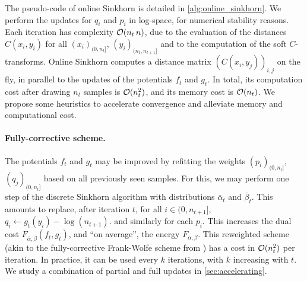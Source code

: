 The pseudo-code of online Sinkhorn is detailed in \autoref{alg:online_sinkhorn}.
We perform the updates for $q_i$ and $p_i$ in log-space, for numerical stability reasons.
Each iteration has complexity $\mathcal{O}(n_t\,n)$, due to the evaluation of the
distances $C(x_i, y_i)$ for all $(x_i)_{(0, n_t]}$, $(y_i)_{(n_t, n_{t+1}]}$
and to the computation of the
soft $C$-transforms. Online Sinkhorn computes a distance matrix
$(C(x_i,y_j))_{i,j}$ on the fly, in parallel to the updates of the potentials
$f_t$ and $g_t$. In total, its computation cost after drawing $n_t$ samples is
$\mathcal{O}(n_t^2)$, and its memory cost is $\mathcal{O}(n_t)$.
%
We propose some heuristics to accelerate convergence and alleviate memory and computational cost.


\paragraph{Fully-corrective scheme.} 

The potentials $f_t$ and $g_t$ may be improved by refitting the weights
$(p_i)_{(0, n_t]}$, $(q_j)_{(0, n_t]}$ based on all previously seen samples.  For this, we 
may perform one step of the discrete Sinkhorn algorithm with
distributions $\bar \alpha_t$ and $\bar \beta_t$.
This amounts to replace, after iteration $t$, for all $i \in (0, n_{t+1}]$,
$q_i \gets g_t(y_i) - \log(n_{t+1})$. and similarly for each $p_i$. This increases the dual cost
$F_{ \bar \alpha, \bar \beta}(f_t, g_t)$, and ``on average'', the energy
$F_{\alpha, \beta}$. This reweighted scheme (akin to the fully-corrective
Frank-Wolfe scheme from \cite{lacoste2015global}) has a cost in $\mathcal{O}(n_t^2)$
per iteration. In practice, it can be used every $k$ iterations, with $k$
increasing with $t$. We study a combination of partial and full updates in
\autoref{sec:accelerating}.



